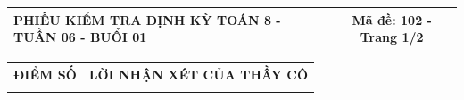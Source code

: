 \documentclass[12pt,a4paper]{article}
\begin{document}
\newpage


\noindent
\begin{tabularx}{\linewidth}{|X|c|}
\hline
\textbf{PHIẾU KIỂM TRA ĐỊNH KỲ TOÁN 8 - TUẦN 06 - BUỔI 01} & \textbf{Mã đề: 102 - Trang 1/2} \\
\hline
\end{tabularx}

\vspace{1mm}

\noindent
\begin{tabularx}{\linewidth}{|p{3.2cm}|X|}
\hline
\centering\textbf{ĐIỂM SỐ} & \centering\textbf{LỜI NHẬN XÉT CỦA THẦY CÔ} \tabularnewline
\hline
\rule{0pt}{1.8cm} & \tabularnewline
\hline
\end{tabularx}

\vspace{1.2mm}
\end{document}
